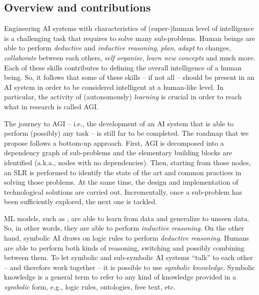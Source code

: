 \begin{refsection}
\section{Overview and contributions}
\label{sec:overview-and-contributions}
%
Engineering \gls{AI} systems with characteristics of (super-)human level of intelligence is a challenging task that requires to solve many sub-problems.
%
Human beings are able to perform \emph{deductive} and \emph{inductive reasoning}, \emph{plan}, \emph{adapt} to changes, \emph{collaborate} between each others, \emph{self organise}, \emph{learn new concepts} and much more.
%
Each of these skills contributes to defining the overall intelligence of a human being.
%
So, it follows that some of these skills -- if not all -- should be present in an \gls{AI} system in order to be considered intelligent at a human-like level.
%
In particular, the activity of (autonomously) \emph{learning} is crucial in order to reach what in research is called \gls{AGI}.


The journey to \gls{AGI} -- i.e., the development of an \gls{AI} system that is able to perform (possibly) any task -- is still far to be completed.
%
The roadmap that we propose follows a bottom-up approach.
%
%
First, \gls{AGI} is decomposed into a dependency graph of sub-problems and the elementary building blocks are identified (a.k.a., nodes with no dependencies).
%
Then, starting from those nodes, an \gls{SLR} is performed to identify the state of the art and common practices in solving those problems.
%
At the same time, the design and implementation of technological solutions are carried out.
%
Incrementally, once a sub-problem has been sufficiently explored, the next one is tackled.


\Gls{ML} models, such as , are able to learn from data and generalize to unseen data.
%
So, in other words, they are able to perform \emph{inductive reasoning}.
%
On the other hand, symbolic \gls{AI} draws on logic rules to perform \emph{deductive reasoning}.
%
Humans are able to perform both kinds of reasoning, switching and possibly combining between them.
%
To let symbolic and sub-symbolic \gls{AI} systems ``talk'' to each other -- and therefore work together -- it is possible to use \emph{symbolic knowledge}.
%
Symbolic knowledge is a general term to refer to any kind of knowledge provided in a \emph{symbolic} form, e.g., logic rules, ontologies, free text, etc.



\end{refsection}
